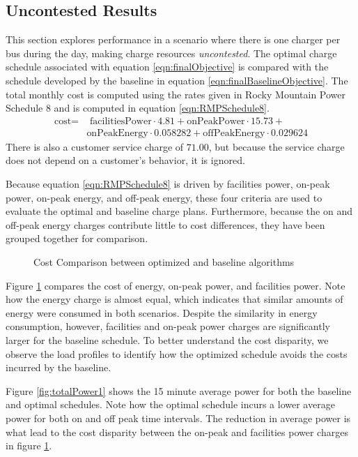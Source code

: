 \subsection{Uncontested Results}
	This section explores performance in a scenario where there is one charger per bus during the day, making charge resources \textit{uncontested}. The optimal charge schedule associated with equation \ref{eqn:finalObjective} is compared with the schedule developed by the baseline in equation \ref{eqn:finalBaselineObjective}. The total monthly cost is computed using the rates given in Rocky Mountain Power Schedule 8 and is computed in equation \ref{eqn:RMPSchedule8}.
	\begin{equation}\label{eqn:RMPSchedule8}
		\begin{aligned}
			\text{cost} = & \text{ facilitiesPower}\cdot 4.81 + \text{onPeakPower}\cdot 15.73 + \\ 
			& \text{onPeakEnergy}\cdot 0.058282 + \text{offPeakEnergy}\cdot 0.029624
		\end{aligned}
	\end{equation}
	There is also a customer service charge of $71.00$, but because the service charge does not depend on a customer's behavior, it is ignored.
	\par Because equation \ref{eqn:RMPSchedule8} is driven by facilities power, on-peak power, on-peak energy, and off-peak energy, these four criteria are used to evaluate the optimal and baseline charge plans.  Furthermore, because the on and off-peak energy charges contribute little to cost differences, they have been grouped together for comparison.
\begin{figure}
	\centering
	\caption{Cost Comparison between optimized and baseline algorithms}
	\label{fig:costComparison}
\end{figure}
\par  Figure \ref{fig:costComparison} compares the cost of energy, on-peak power, and facilities power. Note how the energy charge is almost equal, which indicates that similar amounts of energy were consumed in both scenarios. Despite the similarity in energy consumption, however, facilities and on-peak power charges are significantly larger for the baseline schedule. To better understand the cost disparity, we observe the load profiles to identify how the optimized schedule avoids the costs incurred by the baseline.
	\par Figure \ref{fig:totalPower1} shows the 15 minute average power for both the baseline and optimal schedules. Note how the optimal schedule incurs a lower average power for both on and off peak time intervals. The reduction in average power is what lead to the cost disparity between the on-peak and facilities power charges in figure \ref{fig:costComparison}. 
